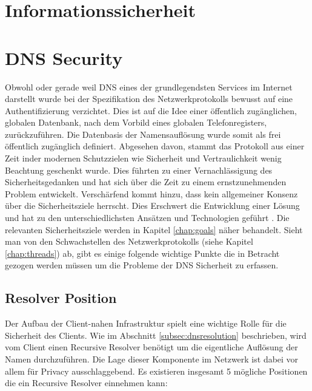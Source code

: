 \section{Informationssicherheit}

\section{DNS Security}
\label{sec:dnssecurity}

Obwohl oder gerade weil DNS eines der grundlegendsten Services im Internet darstellt wurde bei der Spezifikation des Netzwerkprotokolls bewusst auf eine Authentifizierung verzichtet. Dies ist auf die Idee einer öffentlich zugänglichen, globalen Datenbank, nach dem Vorbild eines globalen Telefonregisters, zurückzuführen. Die Datenbasis der Namensauflösung wurde somit als frei öffentlich zugänglich definiert. Abgesehen davon, stammt das Protokoll aus einer Zeit inder modernen Schutzzielen wie Sicherheit und Vertraulichkeit wenig Beachtung geschenkt wurde. Dies führten zu einer Vernachlässigung des Sicherheitsgedanken und hat sich über die Zeit zu einem ernstzunehmenden Problem entwickelt. Verschärfend kommt hinzu, dass kein allgemeiner Konsenz über die Sicherheitsziele herrscht. Dies Erschwert die Entwicklung einer Lösung und hat zu den unterschiedlichsten Ansätzen und Technologien geführt \cite{Grothoff2018}. Die relevanten Sicherheitsziele werden in Kapitel \ref{chap:goals} näher behandelt. Sieht man von den Schwachstellen des Netzwerkprotokolls (siehe Kapitel \ref{chap:threads}) ab, gibt es einige folgende wichtige Punkte die in Betracht gezogen werden müssen um die Probleme der DNS Sicherheit zu erfassen.

\subsection{Resolver Position}
Der Aufbau der Client-nahen Infrastruktur spielt eine wichtige Rolle für die Sicherheit des Clients. Wie im Abschnitt \ref{subsec:dnsresolution} beschrieben, wird vom Client einen Recursive Resolver benötigt um die eigentliche Auflösung der Namen durchzuführen. Die Lage dieser Komponente im Netzwerk ist dabei vor allem für Privacy ausschlaggebend. Es existieren insgesamt 5 mögliche Positionen die ein Recursive Resolver einnehmen kann\cite{VanHeugten2018}:


